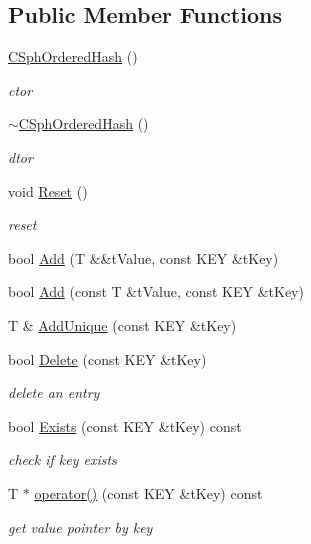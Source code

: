 \subsection*{Public Member Functions}
\begin{DoxyCompactItemize}
\item 
\hyperlink{classCSphOrderedHash_aa81ec84c201a815ffd78acd72b828d30}{C\-Sph\-Ordered\-Hash} ()
\begin{DoxyCompactList}\small\item\em ctor \end{DoxyCompactList}\item 
\hyperlink{classCSphOrderedHash_af3a241c270b95cf24e5d84b1e15a85f2}{$\sim$\-C\-Sph\-Ordered\-Hash} ()
\begin{DoxyCompactList}\small\item\em dtor \end{DoxyCompactList}\item 
void \hyperlink{classCSphOrderedHash_a9b9ef42eb1209b6ac1184ce9340df7f1}{Reset} ()
\begin{DoxyCompactList}\small\item\em reset \end{DoxyCompactList}\item 
bool \hyperlink{classCSphOrderedHash_ab15646f3c9dffc468e7f0f5dc1c87fd7}{Add} (T \&\&t\-Value, const K\-E\-Y \&t\-Key)
\item 
bool \hyperlink{classCSphOrderedHash_ab89cff2117635040668818c6fb63e840}{Add} (const T \&t\-Value, const K\-E\-Y \&t\-Key)
\item 
T \& \hyperlink{classCSphOrderedHash_ada003c0b38329a0219df3eccf95e78a6}{Add\-Unique} (const K\-E\-Y \&t\-Key)
\item 
bool \hyperlink{classCSphOrderedHash_a725799bbf0e27373e3534bdd7e660fbd}{Delete} (const K\-E\-Y \&t\-Key)
\begin{DoxyCompactList}\small\item\em delete an entry \end{DoxyCompactList}\item 
bool \hyperlink{classCSphOrderedHash_a7e2922de52ec5809739283070689ab9a}{Exists} (const K\-E\-Y \&t\-Key) const 
\begin{DoxyCompactList}\small\item\em check if key exists \end{DoxyCompactList}\item 
T $\ast$ \hyperlink{classCSphOrderedHash_aab38191b47c5d07d8771b6c25e962f11}{operator()} (const K\-E\-Y \&t\-Key) const 
\begin{DoxyCompactList}\small\item\em get value pointer by key \end{DoxyCompactList}\item 

\end{DoxyCompactItemize}
